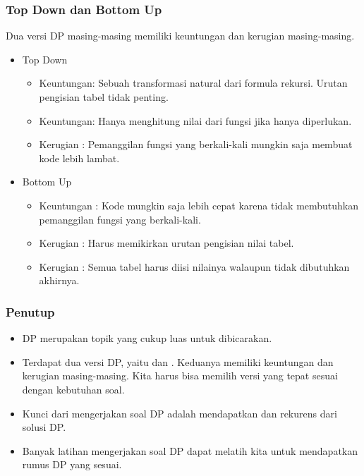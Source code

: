 \begin{frame}
\frametitle{Top Down dan Bottom Up}
Dua versi DP masing-masing memiliki keuntungan dan kerugian masing-masing.
\begin{itemize}
  \item Top Down
  \begin{itemize}
    \item Keuntungan: Sebuah transformasi natural dari formula rekursi. Urutan pengisian tabel tidak penting.
    \item Keuntungan: Hanya menghitung nilai dari fungsi jika hanya diperlukan.
    \item Kerugian : Pemanggilan fungsi yang berkali-kali mungkin saja membuat kode lebih lambat.
  \end{itemize}
  \item Bottom Up
  \begin{itemize}
    \item Keuntungan : Kode mungkin saja lebih cepat karena tidak membutuhkan pemanggilan fungsi yang berkali-kali.
    \item Kerugian : Harus memikirkan urutan pengisian nilai tabel. 
    \item Kerugian : Semua tabel harus diisi nilainya walaupun tidak dibutuhkan akhirnya.
  \end{itemize}
\end{itemize}
\end{frame}

\begin{frame}
\frametitle{Penutup}
\begin{itemize}
  \item DP merupakan topik yang cukup luas untuk dibicarakan.
  \item Terdapat dua versi DP, yaitu  dan . Keduanya memiliki keuntungan dan kerugian masing-masing. Kita harus bisa memilih versi yang tepat sesuai dengan kebutuhan soal.
  \item Kunci dari mengerjakan soal DP adalah mendapatkan  dan rekurens dari solusi DP. 
  \item Banyak latihan mengerjakan soal DP dapat melatih kita untuk mendapatkan rumus DP yang sesuai.
\end{itemize}
\end{frame}


